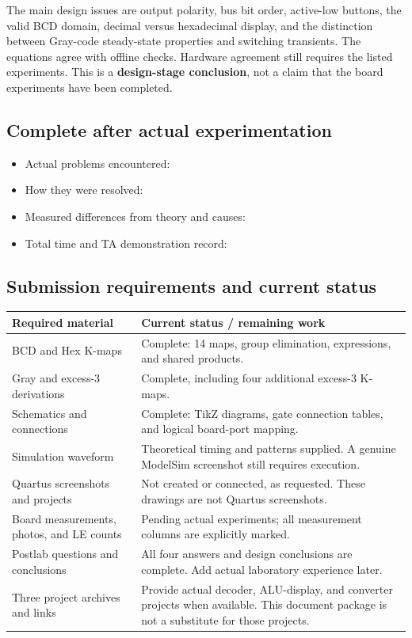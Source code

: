 \documentclass[a4paper,11pt]{article}
\begin{document}
The main design issues are output polarity, bus bit order, active-low buttons, the
valid BCD domain, decimal versus hexadecimal display, and the distinction between
Gray-code steady-state properties and switching transients. The equations agree with
offline checks. Hardware agreement still requires the listed experiments. This is a
\textbf{design-stage conclusion}, not a claim that the board experiments have been completed.
\subsection{Complete after actual experimentation}
\begin{itemize}
\item Actual problems encountered: \underline{\hspace{8cm}}
\item How they were resolved: \underline{\hspace{8cm}}
\item Measured differences from theory and causes: \underline{\hspace{5cm}}
\item Total time and TA demonstration record: \underline{\hspace{6cm}}
\end{itemize}
\subsection{Submission requirements and current status}


\begin{center}\small
\begin{tabular}{>{\raggedright\arraybackslash}p{4.2cm}>{\raggedright\arraybackslash}p{10.1cm}}
\toprule
Required material & Current status / remaining work\\\midrule
BCD and Hex K-maps & Complete: 14 maps, group elimination, expressions, and shared products.\\
Gray and excess-3 derivations & Complete, including four additional excess-3 K-maps.\\
Schematics and connections & Complete: TikZ diagrams, gate connection tables, and logical board-port mapping.\\
Simulation waveform & Theoretical timing and patterns supplied. A genuine ModelSim screenshot still requires execution.\\
Quartus screenshots and projects & Not created or connected, as requested. These drawings are not Quartus screenshots.\\
Board measurements, photos, and LE counts & Pending actual experiments; all measurement columns are explicitly marked.\\
Postlab questions and conclusions & All four answers and design conclusions are complete. Add actual laboratory experience later.\\
Three project archives and links & Provide actual decoder, ALU-display, and converter projects when available. This document package is not a substitute for those projects.\\
\bottomrule\end{tabular}\end{center}
\end{document}
